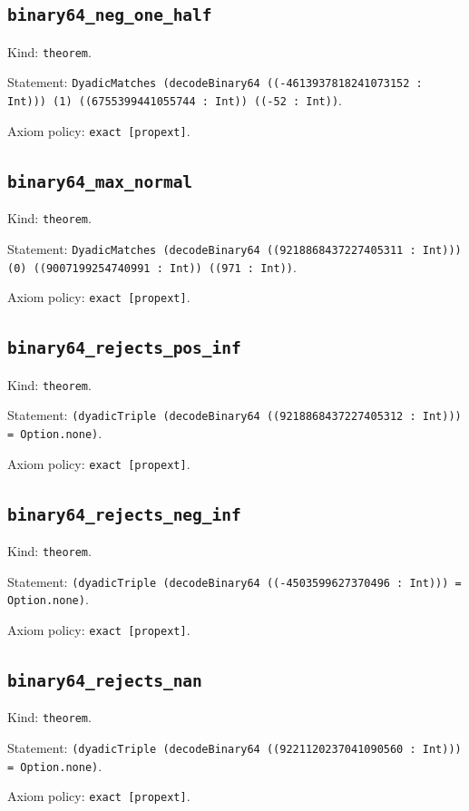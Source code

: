 \documentclass[11pt]{article}
\begin{document}
\subsection*{\texttt{binary64\_neg\_one\_half}}
\noindent Kind: \texttt{theorem}.\par
\noindent Statement: \texttt{DyadicMatches (decodeBinary64 ((-4613937818241073152 : Int))) (1) ((6755399441055744 : Int)) ((-52 : Int))}.\par
\noindent Axiom policy: \texttt{exact [propext]}.\par
\subsection*{\texttt{binary64\_max\_normal}}
\noindent Kind: \texttt{theorem}.\par
\noindent Statement: \texttt{DyadicMatches (decodeBinary64 ((9218868437227405311 : Int))) (0) ((9007199254740991 : Int)) ((971 : Int))}.\par
\noindent Axiom policy: \texttt{exact [propext]}.\par
\subsection*{\texttt{binary64\_rejects\_pos\_inf}}
\noindent Kind: \texttt{theorem}.\par
\noindent Statement: \texttt{(dyadicTriple (decodeBinary64 ((9218868437227405312 : Int))) = Option.none)}.\par
\noindent Axiom policy: \texttt{exact [propext]}.\par
\subsection*{\texttt{binary64\_rejects\_neg\_inf}}
\noindent Kind: \texttt{theorem}.\par
\noindent Statement: \texttt{(dyadicTriple (decodeBinary64 ((-4503599627370496 : Int))) = Option.none)}.\par
\noindent Axiom policy: \texttt{exact [propext]}.\par
\subsection*{\texttt{binary64\_rejects\_nan}}
\noindent Kind: \texttt{theorem}.\par
\noindent Statement: \texttt{(dyadicTriple (decodeBinary64 ((9221120237041090560 : Int))) = Option.none)}.\par
\noindent Axiom policy: \texttt{exact [propext]}.\par
\end{document}
